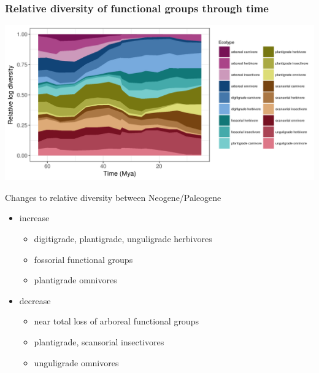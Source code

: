 \documentclass[aspectratio=169]{beamer}
\begin{document}
\begin{frame}
  \frametitle{Relative diversity of functional groups through time}
  \begin{center}
    \includegraphics[height=0.9\textheight,width=\textwidth,keepaspectratio=true]{figure/relative_diversity}
  \end{center}
\end{frame}


\begin{frame}
  \begin{block}{Changes to relative diversity between Neogene/Paleogene}
    \begin{itemize}
      \item \alert{increase}
        \begin{itemize}
          \item digitigrade, plantigrade, unguligrade herbivores
          \item fossorial functional groups
          \item plantigrade omnivores
        \end{itemize}
      \item \alert{decrease}
        \begin{itemize}
          \item near total loss of arboreal functional groups
          \item plantigrade, scansorial insectivores
          \item unguligrade omnivores
        \end{itemize}
    \end{itemize}
  \end{block}
\end{frame}
\end{document}
